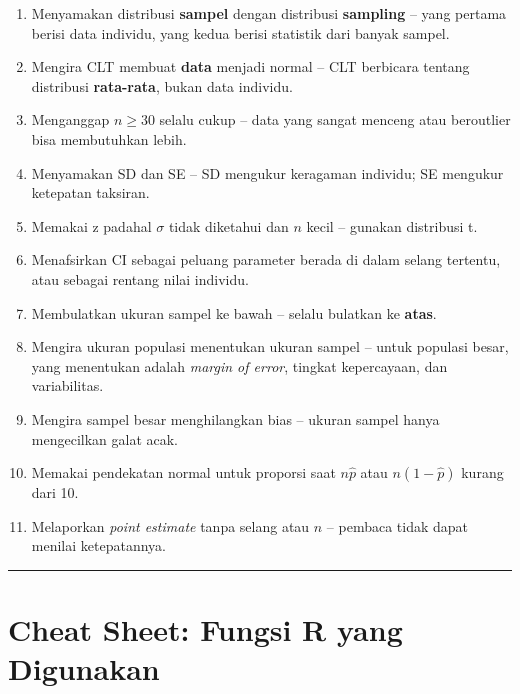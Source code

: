 \documentclass[
  indonesian,
  letterpaper,
]{book}
\providecommand{\tightlist}{%
  \setlength{\itemsep}{0pt}\setlength{\parskip}{0pt}}
\begin{document}
\begin{enumerate}
\def\labelenumi{\arabic{enumi}.}
\tightlist
\item
  Menyamakan distribusi \textbf{sampel} dengan distribusi
  \textbf{sampling} -- yang pertama berisi data individu, yang kedua
  berisi statistik dari banyak sampel.
\item
  Mengira CLT membuat \textbf{data} menjadi normal -- CLT berbicara
  tentang distribusi \textbf{rata-rata}, bukan data individu.
\item
  Menganggap \(n \geq 30\) selalu cukup -- data yang sangat menceng atau
  beroutlier bisa membutuhkan lebih.
\item
  Menyamakan SD dan SE -- SD mengukur keragaman individu; SE mengukur
  ketepatan taksiran.
\item
  Memakai z padahal \(\sigma\) tidak diketahui dan \(n\) kecil --
  gunakan distribusi t.
\item
  Menafsirkan CI sebagai peluang parameter berada di dalam selang
  tertentu, atau sebagai rentang nilai individu.
\item
  Membulatkan ukuran sampel ke bawah -- selalu bulatkan ke
  \textbf{atas}.
\item
  Mengira ukuran populasi menentukan ukuran sampel -- untuk populasi
  besar, yang menentukan adalah \emph{margin of error}, tingkat
  kepercayaan, dan variabilitas.
\item
  Mengira sampel besar menghilangkan bias -- ukuran sampel hanya
  mengecilkan galat acak.
\item
  Memakai pendekatan normal untuk proporsi saat \(n\hat{p}\) atau
  \(n(1-\hat{p})\) kurang dari 10.
\item
  Melaporkan \emph{point estimate} tanpa selang atau \(n\) -- pembaca
  tidak dapat menilai ketepatannya.
\end{enumerate}

\begin{center}\rule{0.5\linewidth}{0.5pt}\end{center}

\section{Cheat Sheet: Fungsi R yang
Digunakan}\label{cheat-sheet-fungsi-r-yang-digunakan}
\end{document}
